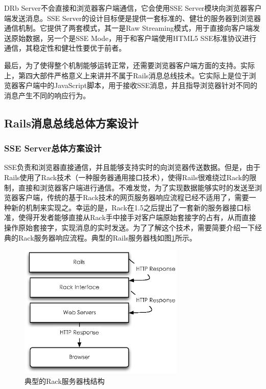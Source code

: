 DRb Server不会直接和浏览器客户端通信，它会使用SSE Server模块向浏览器客户端发送消息。SSE Server的设计目标便是提供一套标准的、健壮的服务器到浏览器通信机制。它提供了两套模式，其一是Raw Streaming模式，用于直接向客户端发送原始数据，另一个是SSE Mode，用于和客户端使用HTML5 SSE标准协议进行通信，其稳定性和健壮性要优于前者。

最后，为了使得整个机制能够运转正常，还需要浏览器客户端方面的支持。实际上，第四大部件严格意义上来讲并不属于Rails消息总线技术。它实际上是位于浏览器客户端中的JavaScript脚本，用于接收SSE消息，并且指导浏览器针对不同的消息产生不同的响应行为。

\subsection{Rails消息总线总体方案设计}

\subsubsection{SSE Server总体方案设计}
SSE负责和浏览器直接通信，并且能够支持实时的向浏览器传送数据。但是，由于Rails使用了Rack技术（一种服务器通用接口技术），使得Rails很难绕过Rack的限制，直接和浏览器客户端进行通信。不难发觉，为了实现数据能够实时的发送至浏览器客户端，传统的基于Rack技术的网页服务器响应流程已经不适用了，需要一种新的机制来实现之。幸运的是，Rack在1.5之后提出了一套新的服务器接口标准，使得开发者能够直接从Rack手中接手对客户端原始套接字的占有，从而直接操作原始套接字，实现消息的实时发送。为了了解这个技术，需要简要介绍一下经典的Rack服务器响应流程。典型的Rails服务器栈如图\ref{fig-server-stack}所示。

\begin{figure}[h]
\centering
\includegraphics[width=0.7\textwidth]{images/overview/rack.eps}
\caption{典型的Rack服务器栈结构}
\label{fig-server-stack}
\end{figure}

